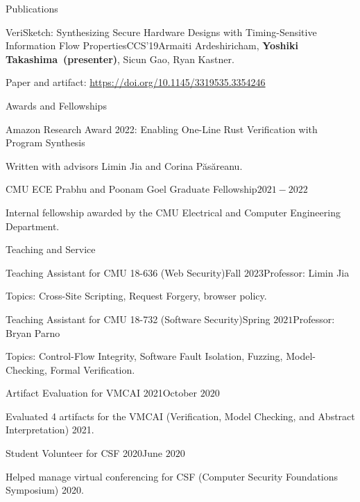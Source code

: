 \documentclass{resume} %
\begin{document}
\begin{rSection}{Publications}
  \begin{rPubsection}{VeriSketch: Synthesizing Secure Hardware Designs
      with Timing-Sensitive Information Flow
      Properties}{CCS'19}{Armaiti Ardeshiricham, \textbf{Yoshiki
        Takashima~(presenter)}, Sicun Gao, Ryan Kastner.}{}

    {\footnotesize Paper and artifact:
      \href{https://dl.acm.org/doi/abs/10.1145/3319535.3354246}
      {https://doi.org/10.1145/3319535.3354246}}
  \end{rPubsection}
\end{rSection}

\begin{rSection}{Awards and Fellowships}

  \begin{rSubsection}{Amazon Research Award 2022: Enabling One-Line Rust
      Verification with Program Synthesis}{}{}{}
  \item Written with advisors Limin Jia and Corina P\u{a}s\u{a}reanu.
  \end{rSubsection}

  \begin{rSubsection}{CMU ECE Prabhu and Poonam Goel Graduate
      Fellowship}{$2021 - 2022$}{}{}
  \item Internal fellowship awarded by the CMU Electrical and Computer
    Engineering Department.
  \end{rSubsection}
\end{rSection}

\begin{rSection}{Teaching and Service}
  \begin{rSubsection}{Teaching Assistant for CMU 18-636 (Web
      Security)}{Fall $2023$}{Professor: Limin Jia}{}
  \item Topics: Cross-Site Scripting, Request Forgery, browser policy.
  \end{rSubsection}

  \begin{rSubsection}{Teaching Assistant for CMU 18-732 (Software
      Security)}{Spring $2021$}{Professor: Bryan Parno}{}
  \item Topics: Control-Flow Integrity, Software Fault Isolation,
    Fuzzing, Model-Checking, Formal Verification.
  \end{rSubsection}

  \begin{rSubsection}{Artifact Evaluation for VMCAI 2021}{October $2020$}
    {}{}
  \item Evaluated 4 artifacts for the VMCAI (Verification, Model
    Checking, and Abstract Interpretation) 2021.
  \end{rSubsection}

  \begin{rSubsection}{Student Volunteer for CSF 2020}{June $2020$}
    {}{}
  \item Helped manage virtual conferencing for CSF
    (Computer Security Foundations Symposium) 2020.
  \end{rSubsection}
\end{rSection}
\end{document}
